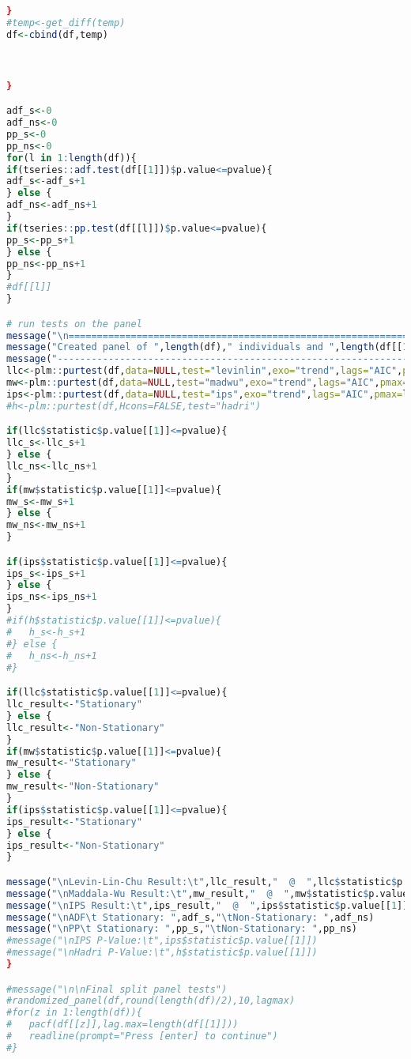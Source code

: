 \begin{lstlisting}[language=R]
}
#temp<-get_diff(temp)
df<-cbind(df,temp)



}

adf_s<-0
adf_ns<-0
pp_s<-0
pp_ns<-0
for(l in 1:length(df)){
if(tseries::adf.test(df[[1]])$p.value<=pvalue){
adf_s<-adf_s+1
} else {
adf_ns<-adf_ns+1
}
if(tseries::pp.test(df[[l]])$p.value<=pvalue){
pp_s<-pp_s+1
} else {
pp_ns<-pp_ns+1
}
#df[[l]]
}

# run tests on the panel
message("\n=========================================================================")
message("Created panel of ",length(df)," individuals and ",length(df[[1]])," observations.")
message("-------------------------------------------------------------------------")
llc<-plm::purtest(df,data=NULL,test="levinlin",exo="trend",lags="AIC",pmax=lagmax)
mw<-plm::purtest(df,data=NULL,test="madwu",exo="trend",lags="AIC",pmax=lagmax)
ips<-plm::purtest(df,data=NULL,test="ips",exo="trend",lags="AIC",pmax=lagmax)
#h<-plm::purtest(df,Hcons=FALSE,test="hadri")

if(llc$statistic$p.value[[1]]<=pvalue){
llc_s<-llc_s+1
} else {
llc_ns<-llc_ns+1
}
if(mw$statistic$p.value[[1]]<=pvalue){
mw_s<-mw_s+1
} else {
mw_ns<-mw_ns+1
}

if(ips$statistic$p.value[[1]]<=pvalue){
ips_s<-ips_s+1
} else {
ips_ns<-ips_ns+1
}
#if(h$statistic$p.value[[1]]<=pvalue){
#	h_s<-h_s+1
#} else {
#	h_ns<-h_ns+1
#}

if(llc$statistic$p.value[[1]]<=pvalue){
llc_result<-"Stationary"
} else {
llc_result<-"Non-Stationary"
}
if(mw$statistic$p.value[[1]]<=pvalue){
mw_result<-"Stationary"
} else {
mw_result<-"Non-Stationary"
}
if(ips$statistic$p.value[[1]]<=pvalue){
ips_result<-"Stationary"
} else {
ips_result<-"Non-Stationary"
}

message("\nLevin-Lin-Chu Result:\t",llc_result,"  @  ",llc$statistic$p.value[[1]])
message("\nMaddala-Wu Result:\t",mw_result,"  @  ",mw$statistic$p.value[[1]])
message("\nIPS Result:\t",ips_result,"  @  ",ips$statistic$p.value[[1]])
message("\nADF\t Stationary: ",adf_s,"\tNon-Stationary: ",adf_ns)
message("\nPP\t Stationary: ",pp_s,"\tNon-Stationary: ",pp_ns)
#message("\nIPS P-Value:\t",ips$statistic$p.value[[1]])
#message("\nHadri P-Value:\t",h$statistic$p.value[[1]])	
}

#message("\n\nFinal split panel tests")
#randomized_panel(df,round(length(df)/2),10,lagmax)
#for(z in 1:length(df)){
#	pacf(df[[z]],lag.max=length(df[[1]]))
#	readline(prompt="Press [enter] to continue")
#}


\end{lstlisting}
